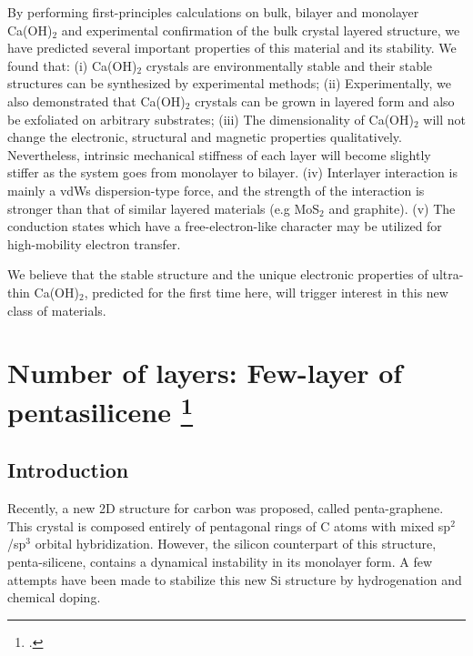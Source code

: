 By performing first-principles calculations on bulk, bilayer and 
monolayer Ca(OH)$_2$ and experimental confirmation of the bulk crystal 
layered structure, we have predicted several important properties of this 
material and its stability. We found that: (i) Ca(OH)$_2$ crystals are 
environmentally stable and their stable structures can be synthesized by 
experimental methods; (ii) Experimentally, we also demonstrated that Ca(OH)$_2$ 
crystals can be grown in layered form and also be exfoliated on arbitrary 
substrates; (iii) The dimensionality of Ca(OH)$_2$ will not change the 
electronic, structural and magnetic properties qualitatively. Nevertheless, intrinsic mechanical stiffness of each layer will become slightly stiffer as 
the system goes from monolayer to bilayer. (iv) Interlayer interaction is mainly a
vdWs dispersion-type force, and
the strength of the interaction is stronger than that of similar layered
materials (e.g MoS$_2$ and graphite). (v) The 
conduction states which have a free-electron-like character may be utilized for 
high-mobility electron transfer. 

We believe that the stable structure and the unique electronic properties of ultra-thin 
Ca(OH)$_2$, predicted for the first time here, will trigger interest in this 
new class of materials. 

\section[Number of layers: Few-layer of pentasilicene]{Number of layers: Few-layer of pentasilicene \footcite[This work is published:][]{Aierken2016.pentasilicene} \label{pSi_layers}}

\subsection{Introduction\label{intro}}

Recently, a new 2D structure for carbon was proposed, called penta-graphene\cite{Zhang2015}. This crystal is composed entirely of pentagonal rings of C atoms with mixed sp$^2$/sp$^3$ orbital hybridization.  However, the silicon counterpart of this structure, penta-silicene, contains a dynamical instability in its monolayer form. A few attempts have been made to stabilize this new Si structure by hydrogenation\cite{Ding2015} and chemical doping\cite{Li2015b}. 

